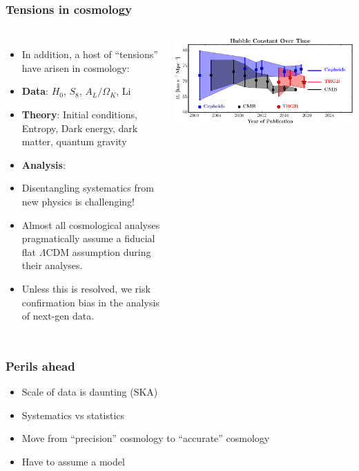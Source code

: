 \documentclass[aspectratio=169,handout]{beamer}
\begin{document}
\begin{frame}
    \frametitle{Tensions in cosmology}
    \begin{columns}
        \begin{itemize}
            \item In addition, a host of ``tensions'' have arisen in cosmology:
            \item \textbf{Data}:
                    $H_0$, $S_8$, $A_L/\Omega_K$, Li
            \item \textbf{Theory}:
                    Initial conditions, Entropy, Dark energy, dark matter, quantum gravity
            \item \textbf{Analysis}:
            \item Disentangling systematics from new physics is challenging!
            \item Almost all cosmological analyses pragmatically assume a fiducial flat $\Lambda$CDM assumption during their analyses.
            \item Unless this is resolved, we risk confirmation bias in the analysis of next-gen data.
        \end{itemize}
        \includegraphics[width=\textwidth]{figures/hubble_tension}
        
    \end{columns}
\end{frame}

\begin{frame}
    \frametitle{Perils ahead}
    \begin{itemize}
        \item Scale of data is daunting (SKA)
        \item Systematics vs statistics
        \item Move from ``precision'' cosmology to ``accurate'' cosmology
        \item Have to assume a model
    \end{itemize}
\end{frame}
\end{document}
